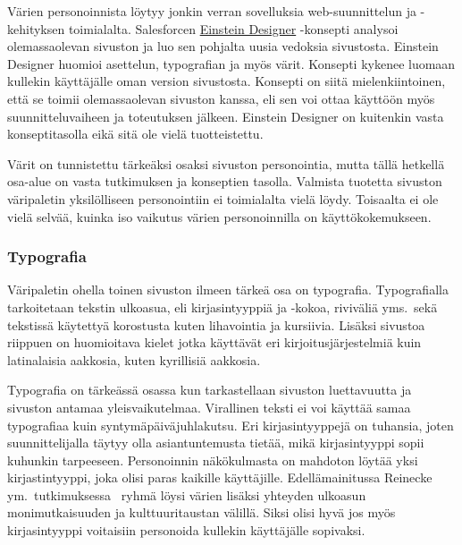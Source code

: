 \documentclass[finnish, 12pt, a4paper, elec, utf8, a-1b, online]{aaltothesis}
\begin{document}
Värien personoinnista löytyy jonkin verran sovelluksia web-suunnittelun ja
-kehityksen toimialalta. Salesforcen
\href{https://medium.com/salesforce-ux/einstein-designer-ai-powered-personalized-design-at-scale-367d71b85a3d}{Einstein
    Designer} -konsepti analysoi olemassaolevan sivuston ja luo sen pohjalta
uusia vedoksia sivustosta. Einstein Designer huomioi asettelun, typografian ja
myös värit. Konsepti kykenee luomaan kullekin käyttäjälle oman version
sivustosta. Konsepti on siitä mielenkiintoinen, että se toimii olemassaolevan
sivuston kanssa, eli sen voi ottaa käyttöön myös suunnitteluvaiheen ja
toteutuksen jälkeen. Einstein Designer on kuitenkin vasta konseptitasolla eikä
sitä ole vielä tuotteistettu.

Värit on tunnistettu tärkeäksi osaksi sivuston personointia, mutta tällä
hetkellä osa-alue on vasta tutkimuksen ja konseptien tasolla. Valmista tuotetta
sivuston väripaletin yksilölliseen personointiin ei toimialalta vielä löydy.
Toisaalta ei ole vielä selvää, kuinka iso vaikutus värien personoinnilla on
käyttökokemukseen.

\subsubsection{Typografia}

Väripaletin ohella toinen sivuston ilmeen tärkeä osa on typografia.
Typografialla tarkoitetaan tekstin ulkoasua, eli kirjasintyyppiä ja -kokoa,
riviväliä yms.~sekä tekstissä käytettyä korostusta kuten lihavointia ja
kursiivia. Lisäksi sivustoa riippuen on huomioitava kielet jotka käyttävät eri
kirjoitusjärjestelmiä kuin latinalaisia aakkosia, kuten kyrillisiä aakkosia.

Typografia on tärkeässä osassa kun tarkastellaan sivuston luettavuutta ja
sivuston antamaa yleisvaikutelmaa. Virallinen teksti ei voi käyttää samaa
typografiaa kuin syntymäpäiväjuhlakutsu. Eri kirjasintyyppejä on tuhansia, joten
suunnittelijalla täytyy olla asiantuntemusta tietää, mikä kirjasintyyppi sopii
kuhunkin tarpeeseen. Personoinnin näkökulmasta on mahdoton löytää yksi
kirjastintyyppi, joka olisi paras kaikille käyttäjille. Edellämainitussa
Reinecke ym.~tutkimuksessa~\cite{10.1145/2556288.2557052} ryhmä löysi värien
lisäksi yhteyden ulkoasun monimutkaisuuden ja kulttuuritaustan välillä. Siksi
olisi hyvä jos myös kirjasintyyppi voitaisiin personoida kullekin käyttäjälle
sopivaksi.
\end{document}
